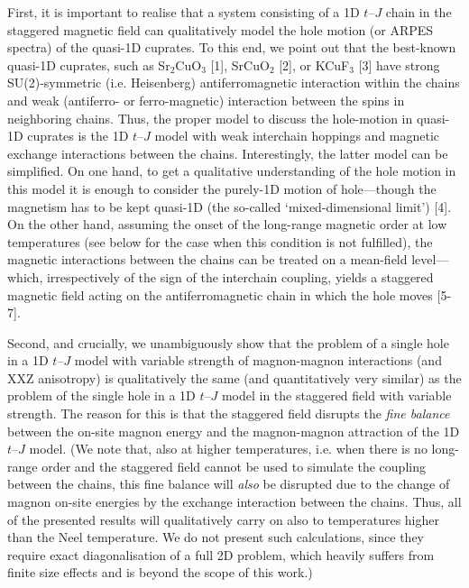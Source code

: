 \documentclass[%
 manuscript,
 amsmath,amssymb,
 aps, onecolumn,
prl,
]{revtex4-1}
\begin{document}
First, it is important to realise that a system consisting of a 1D $t$--$J$ chain in the staggered magnetic field can qualitatively model the hole motion (or ARPES spectra) of the quasi-1D cuprates. To this end, we point out that the best-known quasi-1D cuprates, such as Sr$_2$CuO$_3$ [1], SrCuO$_2$ [2], or KCuF$_3$ [3] have strong SU(2)-symmetric (i.e. Heisenberg) antiferromagnetic interaction within the chains and weak (antiferro- or ferro-magnetic) interaction between the spins in neighboring chains. Thus, the proper model to discuss the hole-motion in quasi-1D cuprates is the 1D $t$--$J$ model with weak interchain hoppings and magnetic exchange interactions between the chains. Interestingly, the latter model can be simplified. On one hand, to get a qualitative understanding of the hole motion in this model it is enough to consider the purely-1D motion of hole---though the magnetism has to be kept quasi-1D (the so-called `mixed-dimensional limit') [4]. On the other hand, assuming the onset of the long-range magnetic order at low temperatures (see below for the case when this condition is not fulfilled), the magnetic interactions between the chains can be treated on a mean-field level---which, irrespectively of the sign of the interchain coupling, yields a staggered magnetic field acting on the antiferromagnetic chain in which the hole moves [5-7]. 

Second, and crucially, we unambiguously show that the problem of a single hole in a 1D $t$--$J$ model with variable strength of magnon-magnon interactions (and XXZ anisotropy) is qualitatively the same (and quantitatively very similar) as the problem of the single hole in a 1D $t$--$J$ model in the staggered field with variable strength. The reason for this is that the staggered field disrupts the {\it fine balance} between the on-site magnon energy and the magnon-magnon attraction of the 1D $t$--$J$ model. (We note that, also at higher temperatures, i.e. when there is no long-range order and the staggered field cannot be used to simulate the coupling between the chains, this fine balance will {\it also} be disrupted due to the change of magnon on-site energies by the exchange interaction between the chains. Thus, all of the presented results will qualitatively carry on also to temperatures higher than the Neel temperature. We do not present such calculations, since they require exact diagonalisation of a full 2D problem, which heavily suffers from finite size effects and is beyond the scope of this work.)
\end{document}
